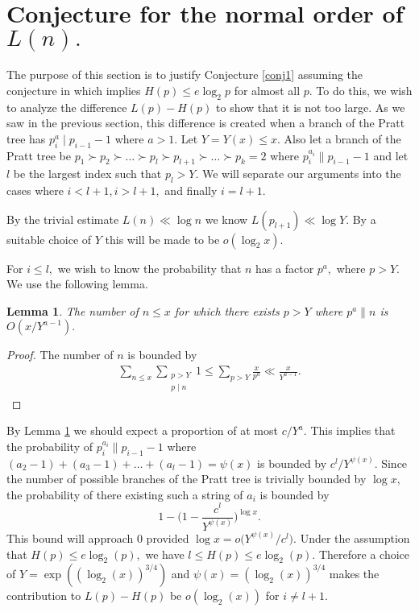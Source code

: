 \documentclass[12pt,regno]{amsart}
\newtheorem{lemma}[theorem]{Lemma}
\begin{document}
\section{Conjecture for the normal order of $L(n).$}
The purpose of this section is to justify Conjecture \ref{conj1} assuming the conjecture in \cite{FKL} which implies $H(p)\le e\log_2 p$ for almost all $p.$ To do this, we wish to analyze the difference $L(p)-H(p)$ to show that it is not too large. As we saw in the previous section, this difference is created when a branch of the Pratt tree has $p_i^a \mid p_{i-1}-1$ where $a>1.$ Let $Y=Y(x)\le x.$ Also let a branch of the Pratt tree be $p_1\succ p_2 \succ \dots \succ p_l \succ p_{l+1} \succ \dots \succ p_k=2$ where $p_i^{a_i} \| p_{i-1}-1$ and let $l$ be the largest index such that $p_l>Y.$ We will separate our arguments into the cases where  $i<l+1, i>l+1,$ and finally $i=l+1.$

By the trivial estimate $L(n) \ll \log n$ we know $L(p_{l+1})\ll \log Y.$ By a suitable choice of $Y$ this will be made to be $o(\log_2 x).$

For $i \le l,$ we wish to know the probability that $n$ has a factor $p^a,$ where $p>Y.$ We use the following lemma.

\begin{lemma}\label{Prob}
The number of $n\le x$ for which there exists $p>Y$ where $p^a \| n$ is $O(x/Y^{a-1}).$
\end{lemma}

\begin{proof}
The number of $n$ is bounded by
\begin{align*}
\sum_{n\le x}\sum_{\substack{p>Y \\ p \mid n}}1 \le \sum_{p>Y}\frac{x}{p^a}\ll \frac{x}{Y^{a-1}}.
\end{align*}
\end{proof}

By Lemma \ref{Prob} we should expect a proportion of at most $c/Y^a.$ This implies that the probability of $p_i^{a_i} \| p_{i-1}-1$ where $(a_2-1)+(a_3-1)+\dots+(a_l-1)=\psi(x)$ is bounded by $c^{l}/Y^{\psi(x)}.$ Since the number of possible branches of the Pratt tree is trivially bounded by $\log x,$ the probability of there existing such a string of $a_i$ is bounded by
$$1-\bigg(1-\frac{c^l}{Y^{\psi(x)}}\bigg)^{\log x}.$$ This bound will approach $0$ provided $\log x =o\big(Y^{\psi(x)}/c^l \big).$ Under the assumption that $H(p)\le e\log_2(p),$ we have $l \le H(p) \le e\log_2(p).$ Therefore a choice of  $Y=\exp((\log_2(x))^{3/4})$ and $\psi(x)=(\log_2(x))^{3/4}$ makes the contribution to $L(p)-H(p)$ be $o(\log_2(x))$ for $i\ne l+1.$
\end{document}
